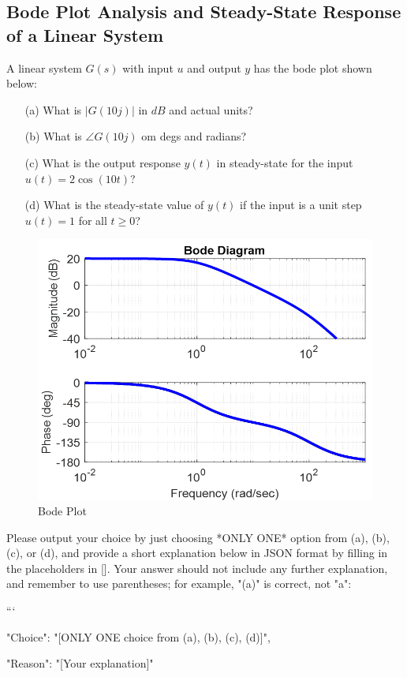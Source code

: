 \documentclass[12pt]{article}
\begin{document}
\subsection{Bode Plot Analysis and Steady-State Response of a Linear System}

A linear system \(G(s)\) with input \(u\) and output \(y\) has the bode plot shown below:
\begin{itemize}
    \item[(a)] What is \(|G(10j)|\) in \(dB\) and actual units?
    \item[(b)] What is \(\angle G(10j)\) om degs and radians?
    \item[(c)] What is the output response \(y(t)\) in steady-state for the input \(u(t) = 2 \cos(10t)\)?
    \item[(d)] What is the steady-state value of \(y(t)\) if the input is a unit step \(u(t) = 1\) for all \(t \geq 0\)?
\end{itemize}
\begin{figure}[h]
\centering
\includegraphics[width=0.6\linewidth]{figs/6.3ver2.png}
\caption{Bode Plot}
\end{figure}


Please output your choice by just choosing *ONLY ONE* option from (a), (b), (c), or (d), and provide a short explanation below in JSON format by filling in the placeholders in []. Your answer should not include any further explanation, and remember to use parentheses; for example, "(a)" is correct, not "a":

```
{

"Choice": "[ONLY ONE choice from (a), (b), (c), (d)]",

"Reason": "[Your explanation]"

}
\end{document}
